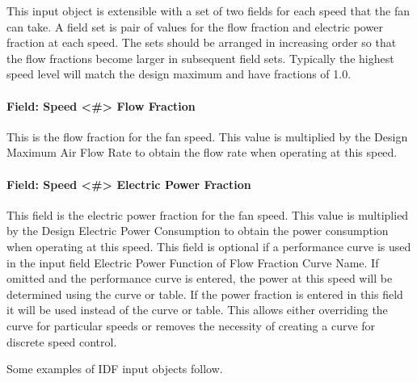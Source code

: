 This input object is extensible with a set of two fields for each speed that the fan can take.  A field set is pair of values for the flow fraction and electric power fraction at each speed. The sets should be arranged in increasing order so that the flow fractions become larger in subsequent field sets.  Typically the highest speed level will match the design maximum and have fractions of 1.0.

\paragraph{Field: Speed <\#> Flow Fraction}\label{field-speed-flow-fraction-fansysmodel}
This is the flow fraction for the fan speed.  This value is multiplied by the Design Maximum Air Flow Rate to obtain the flow rate when operating at this speed.

\paragraph{Field: Speed <\#> Electric Power Fraction}\label{field-speed-power-fraction-fansysmodel}

This field is the electric power fraction for the fan speed.  This value is multiplied by the Design Electric Power Consumption to obtain the power consumption when operating at this speed.  This field is optional if a performance curve is used in the input field Electric Power Function of Flow Fraction Curve Name.  If omitted and the performance curve is entered, the power at this speed will be determined using the curve or table.  If the power fraction is entered in this field it will be used instead of the curve or table.  This allows either overriding the curve for particular speeds or removes the necessity of creating a curve for discrete speed control.

Some examples of IDF input objects follow.

